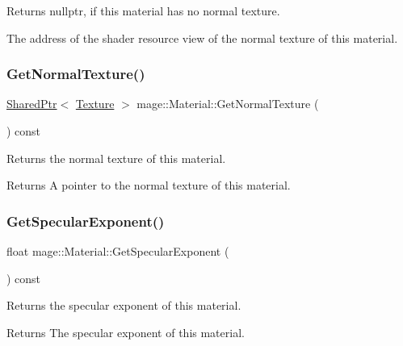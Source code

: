 \begin{DoxyReturn}{Returns}
{\ttfamily nullptr}, if this material has no normal texture. 

The address of the shader resource view of the normal texture of this material. 
\end{DoxyReturn}
\hypertarget{structmage_1_1_material_a7343766b10456e4ed1e09b3fe6110981}{}\label{structmage_1_1_material_a7343766b10456e4ed1e09b3fe6110981} 
\subsubsection{\texorpdfstring{Get\+Normal\+Texture()}{GetNormalTexture()}}
{\footnotesize\ttfamily \hyperlink{namespacemage_a1e01ae66713838a7a67d30e44c67703e}{Shared\+Ptr}$<$ \hyperlink{classmage_1_1_texture}{Texture} $>$ mage\+::\+Material\+::\+Get\+Normal\+Texture (\begin{DoxyParamCaption}{ }\end{DoxyParamCaption}) const\hspace{0.3cm}{\ttfamily [noexcept]}}

Returns the normal texture of this material.

\begin{DoxyReturn}{Returns}
A pointer to the normal texture of this material. 
\end{DoxyReturn}
\hypertarget{structmage_1_1_material_a48afb440024e4e2e45a81ce2b46c0d73}{}\label{structmage_1_1_material_a48afb440024e4e2e45a81ce2b46c0d73} 
\subsubsection{\texorpdfstring{Get\+Specular\+Exponent()}{GetSpecularExponent()}}
{\footnotesize\ttfamily float mage\+::\+Material\+::\+Get\+Specular\+Exponent (\begin{DoxyParamCaption}{ }\end{DoxyParamCaption}) const\hspace{0.3cm}{\ttfamily [noexcept]}}

Returns the specular exponent of this material.

\begin{DoxyReturn}{Returns}
The specular exponent of this material. 
\end{DoxyReturn}
\hypertarget{structmage_1_1_material_aca8740404b0e52c781dd1c02ec167539}{}\label{structmage_1_1_material_aca8740404b0e52c781dd1c02ec167539} 
